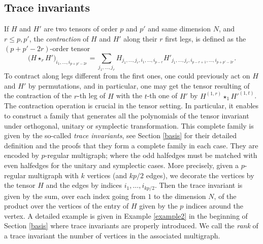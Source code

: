 \documentclass[pdftex]{sigma}
\numberwithin{equation}{section}
\theoremstyle{definition}
\begin{document}
\subsection{Trace invariants}\label{trace_inv}

If $H$ and $H'$ are two tensors of order $p$ and $p'$ and same dimension $N$, and $r\leq p,p'$, the {\em contraction} of $H$ and $H'$ along their $r$ first legs, is defined as the $(p+p'-2r)$-order tensor
\[ \bigl(H \star_r H'\bigr)_{i_1,\dots,i_{p+p'-2r}} = \sum_{j_1,\dots,j_{r}}  H_{j_1,\dots,j_r,i_1,\dots,i_{p-r}} H'_{j_1,\dots,j_{r},i_{p-r+1},\dots,i_{p+p'-2r}} . \]
To contract along legs different from the first ones, one could previously act on $H$ and $H'$ by permutations, and in particular, one may get the tensor resulting of the contraction of the $r$-th leg of $H$ with the $t$-th one of $H'$ by $H^{(1,r)} \star_1 H'^{(1,t)}$. The contraction operation is crucial in the tensor setting. In particular, it enables to construct a family that generates all the polynomials of the tensor invariant under orthogonal, unitary or symplectic transformation. This complete family is given by the so-called {\em trace invariants}, see Section \ref{basis} for their detailed definition and the proofs that they form a complete family in each case. They are encoded by $p$-regular multigraph; where the odd halfedges must be matched with even halfedges for the unitary and symplectic cases. More precisely, given a $p$-regular multigraph with $k$ vertices (and $kp/2$ edges), we decorate the vertices by the tensor $H$ and the edges by indices $i_1,\dots,i_{kp/2}$. Then the trace invariant is given by the sum, over each index going from $1$ to the dimension $N$, of the product over the vertices of the entry of $H$ given by the $p$ indices around the vertex. A detailed example is given in Example \ref{example2} in the beginning of Section \ref{basis} where trace invariants are properly introduced.
We call the {\em rank} of a trace invariant the number of vertices in the associated multigraph.
\end{document}
